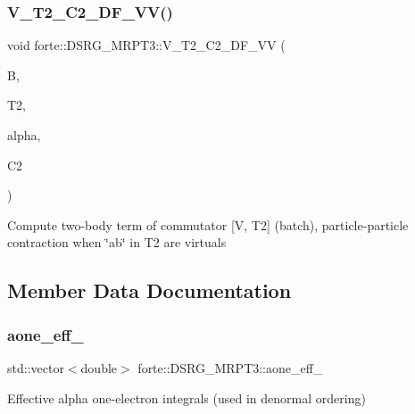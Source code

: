\subsubsection{\texorpdfstring{V\+\_\+\+T2\+\_\+\+C2\+\_\+\+D\+F\+\_\+\+V\+V()}{V\_T2\_C2\_DF\_VV()}}
{\footnotesize\ttfamily void forte\+::\+D\+S\+R\+G\+\_\+\+M\+R\+P\+T3\+::\+V\+\_\+\+T2\+\_\+\+C2\+\_\+\+D\+F\+\_\+\+VV (\begin{DoxyParamCaption}\item[{Blocked\+Tensor \&}]{B,  }\item[{Blocked\+Tensor \&}]{T2,  }\item[{const double \&}]{alpha,  }\item[{Blocked\+Tensor \&}]{C2 }\end{DoxyParamCaption})\hspace{0.3cm}{\ttfamily [protected]}}

Compute two-\/body term of commutator \mbox{[}V, T2\mbox{]} (batch), particle-\/particle contraction when \char`\"{}ab\char`\"{} in T2 are virtuals 

\subsection{Member Data Documentation}
\mbox{\label{classforte_1_1_d_s_r_g___m_r_p_t3_af947d5aa4c9aee775d56ad6085e299ac}} 
\subsubsection{\texorpdfstring{aone\+\_\+eff\+\_\+}{aone\_eff\_}}
{\footnotesize\ttfamily std\+::vector$<$double$>$ forte\+::\+D\+S\+R\+G\+\_\+\+M\+R\+P\+T3\+::aone\+\_\+eff\+\_\+\hspace{0.3cm}{\ttfamily [protected]}}



Effective alpha one-\/electron integrals (used in denormal ordering) 

\mbox{\label{classforte_1_1_d_s_r_g___m_r_p_t3_ad2075beaa4159ef620f34df0fc5fdd64}} 
